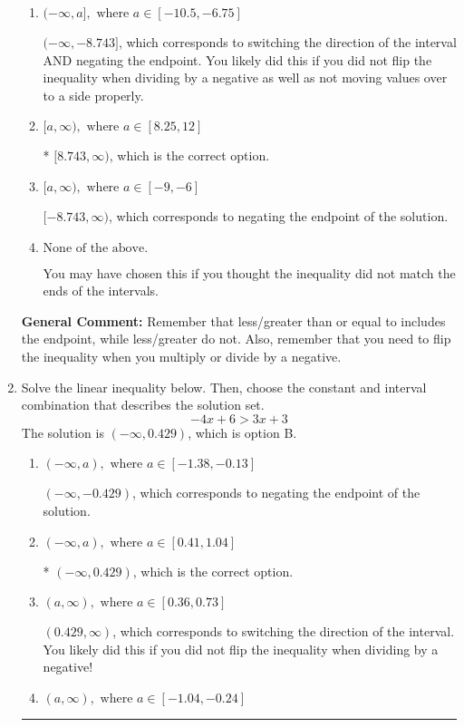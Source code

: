 \documentclass{extbook}[14pt]
\newcommand{\litem}[1]{\item #1

\rule{\textwidth}{0.4pt}}
\begin{document}
\begin{enumerate}
{\begin{enumerate}[label=\Alph*.]
 $(-\infty, 8.743]$, which corresponds to switching the direction of the interval. You likely did this if you did not flip the inequality when dividing by a negative!
\item \( (-\infty, a], \text{ where } a \in [-10.5, -6.75] \)

 $(-\infty, -8.743]$, which corresponds to switching the direction of the interval AND negating the endpoint. You likely did this if you did not flip the inequality when dividing by a negative as well as not moving values over to a side properly.
\item \( [a, \infty), \text{ where } a \in [8.25, 12] \)

* $[8.743, \infty)$, which is the correct option.
\item \( [a, \infty), \text{ where } a \in [-9, -6] \)

 $[-8.743, \infty)$, which corresponds to negating the endpoint of the solution.
\item \( \text{None of the above}. \)

You may have chosen this if you thought the inequality did not match the ends of the intervals.
\end{enumerate}

\textbf{General Comment:} Remember that less/greater than or equal to includes the endpoint, while less/greater do not. Also, remember that you need to flip the inequality when you multiply or divide by a negative.
}
\litem{
Solve the linear inequality below. Then, choose the constant and interval combination that describes the solution set.
\[ -4x + 6 > 3x + 3 \]The solution is \( (-\infty, 0.429) \), which is option B.\begin{enumerate}[label=\Alph*.]
\item \( (-\infty, a), \text{ where } a \in [-1.38, -0.13] \)

 $(-\infty, -0.429)$, which corresponds to negating the endpoint of the solution.
\item \( (-\infty, a), \text{ where } a \in [0.41, 1.04] \)

* $(-\infty, 0.429)$, which is the correct option.
\item \( (a, \infty), \text{ where } a \in [0.36, 0.73] \)

 $(0.429, \infty)$, which corresponds to switching the direction of the interval. You likely did this if you did not flip the inequality when dividing by a negative!
\item \( (a, \infty), \text{ where } a \in [-1.04, -0.24] \)


\end{enumerate}}
\end{enumerate}
\end{document}
